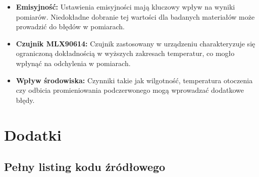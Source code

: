 \begin{itemize}
    \item \textbf{Emisyjność:} Ustawienia emisyjności mają kluczowy wpływ na wyniki pomiarów. Niedokładne dobranie tej wartości dla badanych materiałów może prowadzić do błędów w pomiarach.
    \item \textbf{Czujnik MLX90614:} Czujnik zastosowany w urządzeniu charakteryzuje się ograniczoną dokładnością w wyższych zakresach temperatur, co mogło wpłynąć na odchylenia w pomiarach.
    \item \textbf{Wpływ środowiska:} Czynniki takie jak wilgotność, temperatura otoczenia czy odbicia promieniowania podczerwonego mogą wprowadzać dodatkowe błędy.
\end{itemize}




\chapter*{Dodatki}

\section*{Pełny listing kodu źródłowego}


